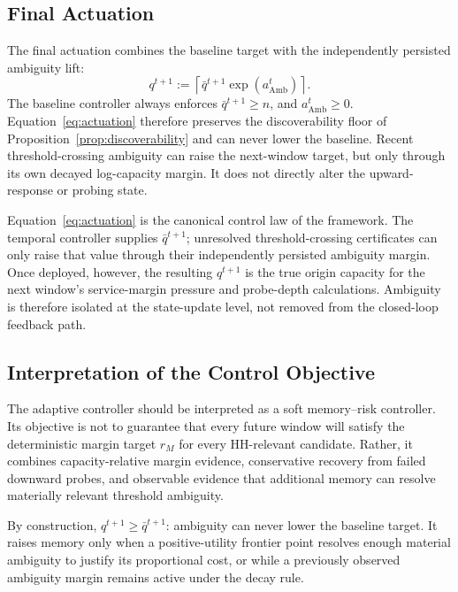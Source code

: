\documentclass[sigconf, nonacm]{acmart}
\begin{document}
\subsection{Final Actuation}
\label{subsec:pred-actuation}

The final actuation combines the baseline target with the independently persisted ambiguity lift:
\begin{equation}
\label{eq:actuation}
q^{t+1}
:=
\left\lceil
\bar q^{t+1}\exp(a_{\mathrm{Amb}}^t)
\right\rceil.
\end{equation}
The baseline controller always enforces \(\bar q^{t+1}\ge n\), and
\(a_{\mathrm{Amb}}^t\ge0\). Equation~\eqref{eq:actuation} therefore preserves
the discoverability floor of Proposition~\ref{prop:discoverability} and can
never lower the baseline. Recent threshold-crossing ambiguity can raise the
next-window target, but only through its own decayed log-capacity margin. It
does not directly alter the upward-response or probing state.

Equation~\eqref{eq:actuation} is the canonical control law of the framework. The temporal controller supplies \(\bar q^{t+1}\); unresolved threshold-crossing certificates can only raise that value through their independently persisted ambiguity margin. Once deployed, however, the resulting \(q^{t+1}\) is the true origin capacity for the next window's service-margin pressure and probe-depth calculations. Ambiguity is therefore isolated at the state-update level, not removed from the closed-loop feedback path.

\subsection{Interpretation of the Control Objective}
\label{subsec:pred-interpretation}

The adaptive controller should be interpreted as a soft memory--risk controller. Its objective is not to guarantee that every future window will satisfy the deterministic margin target \(r_M\) for every HH-relevant candidate. Rather, it combines capacity-relative margin evidence, conservative recovery from failed downward probes, and observable evidence that additional memory can resolve materially relevant threshold ambiguity.

By construction, \(q^{t+1}\ge\bar q^{t+1}\): ambiguity can never lower the baseline target. It raises memory only when a positive-utility frontier point resolves enough material ambiguity to justify its proportional cost, or while a previously observed ambiguity margin remains active under the decay rule.
\end{document}
